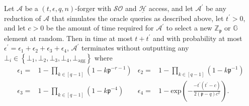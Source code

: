 \documentclass{iacrtrans}
\theoremstyle{definition}
\numberwithin{theorem}{subsection}
\numberwithin{lemma}{theorem}
\newcommand{\adversary}{\mathcal{A}}
\newcommand{\group}{\mathbb{G}}
\begin{document}
\begin{lemma}\label{firstNonFail}
Let $\mathcal{A}$ be a $(t,\epsilon,q,n)$-forger with $\mathcal{SO}$ and $\underline{\mathcal{H}}$ access, and let $\adversary^\prime$ be any reduction of $\mathcal{A}$ that simulates the oracle queries as described above, let $t^\prime > 0$, and let $c > 0$ be the amount of time required for $\adversary^\prime$ to select a new $\mathbb{Z}_\mathfrak{p}$ or $\group$ element at random. Then in time at most $t+t^\prime$ and with probability at most $\epsilon^\prime = \epsilon_1 + \epsilon_2 + \epsilon_3 + \epsilon_4$, $\adversary^\prime$ terminates without outputting any $\bot_i \in \left\{\bot_1, \bot_2, \bot_3, \bot_4, \bot_{\text{agg}}\right\}$ where
\begin{align*}
\epsilon_1 =& 1 - \prod_{k \in [q-1]} (1-k \mathfrak{p}^{-r-1}) &
\epsilon_2 =& 1 - \prod_{k \in [q-1]} (1-k \mathfrak{p}^{-1}) \\
\epsilon_3 =& 1 - \prod_{k \in [q-1]} (1-k \mathfrak{p}^{-4}) &
\epsilon_4 =& 1 - \text{exp}(-\frac{-t^\prime(t^\prime-c)}{2(\mathfrak{p}-q)c^2}).
\end{align*}
\end{lemma}
\end{document}
